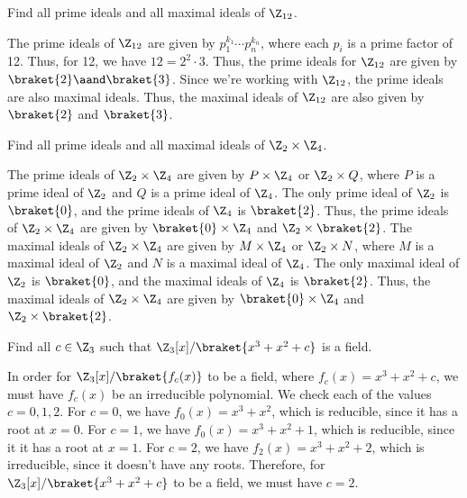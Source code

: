 \begin{problem}[31.2]
  Find all prime ideals and all maximal ideals of $\Z_{12}$.
\end{problem}

\begin{solution}
  The prime ideals of $\Z_{12}$ are given by $p_1^{k_1} \cdots p_n^{k_n}$, where each $p_i$ is a prime factor of 12. Thus, for 12, we have $12 = 2^2 \cdot 3$. Thus, the prime ideals for $\Z_{12}$ are given by $\braket{2} \aand \braket{3}$. Since we're working with $\Z_{12}$, the prime ideals are also maximal ideals. Thus, the maximal ideals of $\Z_{12}$ are also given by $\braket{2}$ and $\braket{3}$.
\end{solution}

\begin{problem}[31.4]
  Find all prime ideals and all maximal ideals of $\Z_2 \times \Z_4$.
\end{problem}

\begin{solution}
  The prime ideals of $\Z_2 \times \Z_4$ are given by $P \times \Z_4$ or $\Z_2 \times Q$, where $P$ is a prime ideal of $\Z_2$ and $Q$ is a prime ideal of $\Z_4$. The only prime ideal of $\Z_2$ is $\braket{0}$, and the prime ideals of $\Z_4$ is $\braket{2}$. Thus, the prime ideals of $\Z_2 \times \Z_4$ are given by $\braket{0} \times \Z_4$  and $\Z_2 \times \braket{2}$. The maximal ideals of $\Z_2 \times \Z_4$ are given by $M \times \Z_4$ or $\Z_2 \times N$, where $M$ is a maximal ideal of $\Z_2$ and $N$ is a maximal ideal of $\Z_4$. The only maximal ideal of $\Z_2$ is $\braket{0}$, and the maximal ideals of $\Z_4$ is $\braket{2}$. Thus, the maximal ideals of $\Z_2 \times \Z_4$ are given by $\braket{0} \times \Z_4$  and $\Z_2 \times \braket{2}$.
\end{solution}

\begin{problem}[31.6]
  Find all $c \in \Z_3$ such that $\Z_3[x]/\braket{x^3 + x^2 + c}$ is a field.
\end{problem}

\begin{solution}
  In order for $\Z_3[x]/\braket{f_c(x)}$ to be a field, where $f_c(x) = x^3 + x^2 + c$, we must have $f_c(x)$ be an irreducible polynomial. We check each of the values $c = 0, 1, 2$. For $c = 0$, we have $f_0(x) = x^3 + x^2$, which is reducible, since it has a root at $x = 0$. For $c = 1$, we have $f_0(x) = x^3 + x^2 + 1$, which is reducible, since it it has a root at $x = 1$. For $c = 2$, we have $f_2(x) = x^3 + x^2 + 2$, which is irreducible, since it doesn't have any roots. Therefore, for $\Z_3[x]/\braket{x^3 + x^2 + c}$ to be a field, we must have $c = 2$.
\end{solution}

